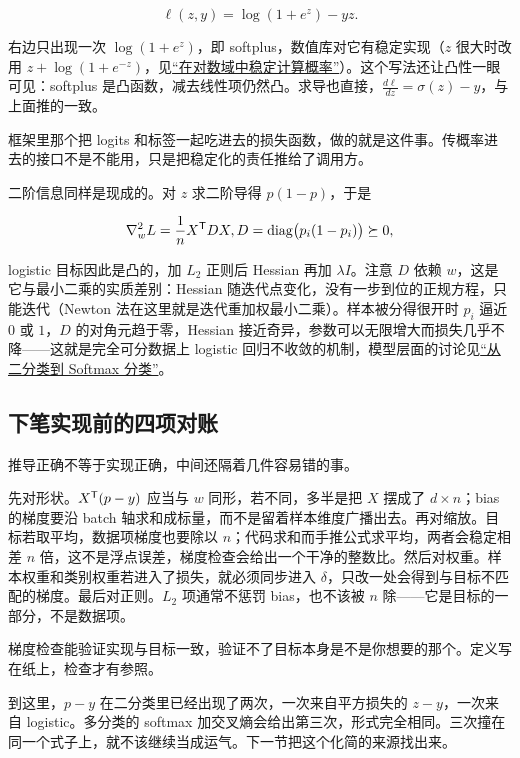 \[
\ell(z,y)=\log(1+e^z)-yz.
\]

右边只出现一次 \(\log(1+e^z)\)，即 softplus，数值库对它有稳定实现（\(z\) 很大时改用 \(z+\log(1+e^{-z})\)，见\hyperref[sec:08-Numerical-Analysis/07-Numerical-Methods-for-ML/01]{``在对数域中稳定计算概率''}）。这个写法还让凸性一眼可见：softplus 是凸函数，减去线性项仍然凸。求导也直接，\(\frac{d\ell}{dz}=\sigma(z)-y\)，与上面推的一致。

框架里那个把 logits 和标签一起吃进去的损失函数，做的就是这件事。传概率进去的接口不是不能用，只是把稳定化的责任推给了调用方。

二阶信息同样是现成的。对 \(z\) 求二阶导得 \(p(1-p)\)，于是

\[
\nabla_w^2L=\frac1nX^{\mathsf{T}}DX,
\space
D=\operatorname{diag}\bigl(p_i(1-p_i)\bigr)\succeq0,
\]

logistic 目标因此是凸的，加 \(L_2\) 正则后 Hessian 再加 \(\lambda I\)。注意 \(D\) 依赖 \(w\)，这是它与最小二乘的实质差别：Hessian 随迭代点变化，没有一步到位的正规方程，只能迭代（Newton 法在这里就是迭代重加权最小二乘）。样本被分得很开时 \(p_i\) 逼近 \(0\) 或 \(1\)，\(D\) 的对角元趋于零，Hessian 接近奇异，参数可以无限增大而损失几乎不降——这就是完全可分数据上 logistic 回归不收敛的机制，模型层面的讨论见\hyperref[sec:13-Machine-Learning/02-Linear-Models/03]{``从二分类到 Softmax 分类''}。

\subsection{下笔实现前的四项对账}

推导正确不等于实现正确，中间还隔着几件容易错的事。

先对形状。\(X^{\mathsf{T}}(p-y)\) 应当与 \(w\) 同形，若不同，多半是把 \(X\) 摆成了 \(d\times n\)；bias 的梯度要沿 batch 轴求和成标量，而不是留着样本维度广播出去。再对缩放。目标若取平均，数据项梯度也要除以 \(n\)；代码求和而手推公式求平均，两者会稳定相差 \(n\) 倍，这不是浮点误差，梯度检查会给出一个干净的整数比。然后对权重。样本权重和类别权重若进入了损失，就必须同步进入 \(\delta\)，只改一处会得到与目标不匹配的梯度。最后对正则。\(L_2\) 项通常不惩罚 bias，也不该被 \(n\) 除——它是目标的一部分，不是数据项。

梯度检查能验证实现与目标一致，验证不了目标本身是不是你想要的那个。定义写在纸上，检查才有参照。

到这里，\(p-y\) 在二分类里已经出现了两次，一次来自平方损失的 \(z-y\)，一次来自 logistic。多分类的 softmax 加交叉熵会给出第三次，形式完全相同。三次撞在同一个式子上，就不该继续当成运气。下一节把这个化简的来源找出来。
